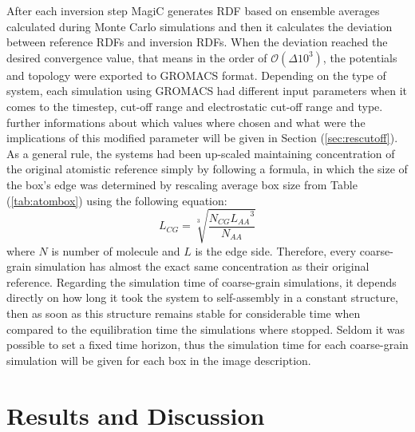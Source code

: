 \documentclass[10pt,a4paper,twoside]{article}
\begin{document}
  After each inversion step MagiC generates RDF based on ensemble averages calculated during Monte Carlo simulations and then it calculates the deviation between reference RDFs and inversion RDFs. When the deviation reached the desired convergence value, that means in the order of $\mathcal{O}(\Delta 10^3)$, the potentials and topology were exported to GROMACS format. Depending on the type of system, each simulation using GROMACS had different input parameters when it comes to the timestep, cut-off range and electrostatic cut-off range and type. further informations about which values where chosen and what were the implications of this modified parameter will be given in Section (\ref{sec:rescutoff}).  As a general rule, the systems had been up-scaled maintaining concentration of the original atomistic reference simply by following a formula, in which the size of the box's edge was determined by rescaling average box size from Table (\ref{tab:atombox}) using the following equation:  
\begin{equation}
L_{CG}=\sqrt[3]{\frac{N_{CG} {L_{AA}}^3}{N_{AA}}}
\label{eqn:bsize}
\end{equation}
where $N$ is number of molecule and $L$ is the edge side. Therefore, every coarse-grain simulation has almost the exact same concentration as their original reference. Regarding the simulation time of coarse-grain simulations, it depends directly on how long it took the system to self-assembly in a constant structure, then as soon as this structure remains stable for considerable time when compared to the equilibration time the simulations where stopped. Seldom it was possible to set a fixed time horizon, thus the simulation time for each coarse-grain simulation will be given for each box in the image description.

\section{Results and Discussion}
\end{document}
